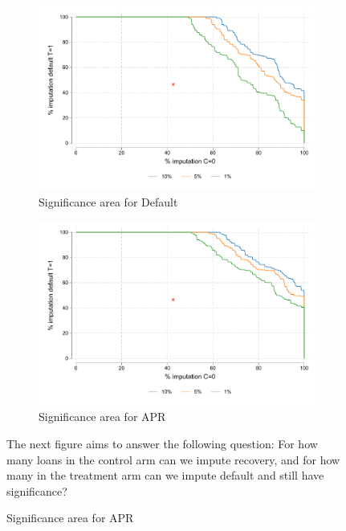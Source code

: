 \begin{figure}[H]
        \caption{Interpolation on bounding censoring}
    \label{interpolation_censoring_imp}
    \begin{center}
   \begin{subfigure}{0.49\textwidth}
   \caption{Significance area for Default }
        \centering
        \includegraphics[width=\textwidth]{Figuras/frontera_sig_def_imp.pdf}
    \end{subfigure} 
   \begin{subfigure}{0.49\textwidth}
   \caption{Significance area for APR}
        \centering
        \includegraphics[width=\textwidth]{Figuras/frontera_sig_apr.pdf}
    \end{subfigure}     
    \end{center}
     \scriptsize  The next figure aims to answer the following question: For how many loans in the control arm can we impute recovery, and for how many in the treatment arm can we impute default and still have significance?

\end{figure}
